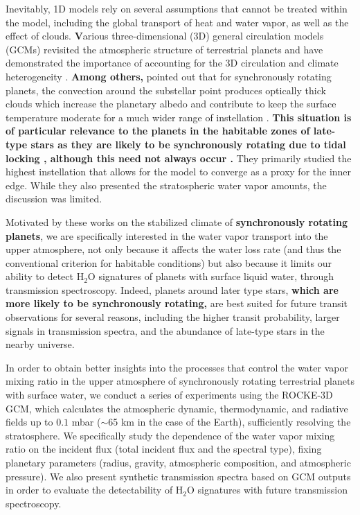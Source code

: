 \documentclass[11pt,numberedappendix,twocolappendix,]{emulateapj}
\def\water{H$_2$O}
\def\modelE{ROCKE-3D}
\def\wv{water vapor}
\def\revise#1{{\bf #1}}
\begin{document}
Inevitably, 1D models rely on several assumptions that cannot be treated within the model, including the global transport of heat and water vapor, as well as the effect of clouds. 
\revise{V}arious three-dimensional (3D) general circulation models (GCMs) revisited the atmospheric structure of terrestrial planets and have demonstrated the importance of accounting for the 3D circulation and climate heterogeneity \citep[e.g.][]{Ishiwatari2002,Abe2011,Leconte2013a,Leconte2013b,Wolf2014,Wolf2015}. 
\revise{Among others,} \citet{Yang2013} pointed out that for synchronously rotating planets, the convection around the substellar point produces optically thick clouds which increase the planetary albedo and contribute to keep the surface temperature moderate for a much wider range of instellation \citep[see also][]{Yang2014,Way2015,Kopparapu2016}. 
\revise{This situation is of particular relevance to the planets in the habitable zones of late-type stars as they are likely to be synchronously rotating due to tidal locking \citep{Dole1964, Kasting1993}, although this need not always occur \citep{Goldreich1966,Leconte2015}. }
They primarily studied the highest instellation that allows for the model to converge as a proxy for the inner edge. 
While they also presented the stratospheric water vapor amounts, the discussion was limited. 

Motivated by these works on the stabilized climate of \revise{synchronously rotating planets}, we are specifically interested in the \wv{} transport into the upper atmosphere, not only because it affects the water loss rate (and thus the conventional criterion for habitable conditions) but also because it limits our ability to detect \water{} signatures of planets with surface liquid water, through transmission spectroscopy. 
%
Indeed, planets around later type stars, \revise{which are more likely to be synchronously rotating,} are best suited for future transit observations for several reasons, including the higher transit probability, larger signals in transmission spectra, and the abundance of late-type stars in the nearby universe. 

In order to obtain better insights into the processes that control the \wv{}  mixing ratio in the upper atmosphere of synchronously rotating terrestrial planets with surface water, we conduct a series of experiments using the \modelE{} GCM, which calculates the atmospheric dynamic, thermodynamic, and radiative fields up to $0.1$ mbar ($\sim $65 km in the case of the Earth), sufficiently resolving the stratosphere. 
We specifically study the dependence of the \wv{} mixing ratio on the incident flux (total incident flux and the spectral type), fixing planetary parameters (radius, gravity, atmospheric composition, and atmospheric pressure). 
We also present synthetic transmission spectra based on GCM outputs in order to evaluate the detectability of \water{} signatures with future transmission spectroscopy. 
\end{document}
